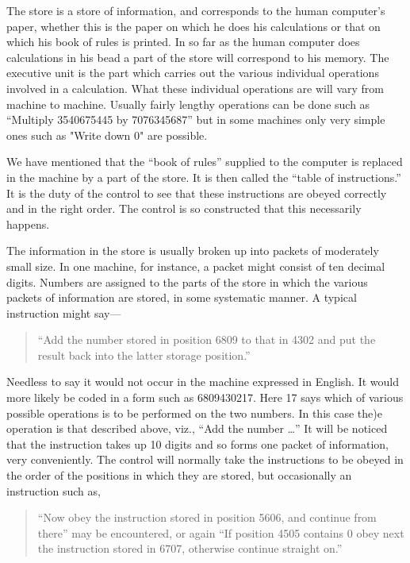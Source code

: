 \documentclass[10pt,twoside,openright]{memoir}
\begin{document}
The store is a store of information, and corresponds to the human computer's paper, whether this is the paper on which he does his calculations or that on which his book of rules is printed. In so far as the human computer does calculations in his bead a part of the store will correspond to his memory.
The executive unit is the part which carries out the various individual operations involved in a calculation. What these individual operations are will vary from machine to machine. Usually fairly lengthy operations can be done such as ``Multiply 3540675445 by 7076345687'' but in some machines only very simple ones such as "Write down 0" are possible.

We have mentioned that the ``book of rules'' supplied to the computer is replaced in the machine by a part of the store. It is then called the ``table of instructions.'' It is the duty of the control to see that these instructions are obeyed correctly and in the right order. The control is so constructed that this necessarily happens.

The information in the store is usually broken up into packets of moderately small size. In one machine, for instance, a packet might consist of ten decimal digits. Numbers are assigned to the parts of the store in which the various packets of information are stored, in some systematic manner. A typical instruction might say---

\begin{quotation}
``Add the number stored in position 6809 to that in 4302 and put the result back into the latter storage position.''
\end{quotation}

Needless to say it would not occur in the machine expressed in English. It would more likely be coded in a form such as 6809430217. Here 17 says which of various possible operations is to be performed on the two numbers. In this case the)e operation is that described above, viz., ``Add the number \dots'' It will be noticed that the instruction takes up 10 digits and so forms one packet of information, very conveniently. The control will normally take the instructions to be obeyed in the order of the positions in which they are stored, but occasionally an instruction such as,

\begin{quotation}
``Now obey the instruction stored in position 5606, and continue from there'' may be encountered, or again ``If position 4505 contains 0 obey next the instruction stored in 6707, otherwise continue straight on.''
\end{quotation}
\end{document}
